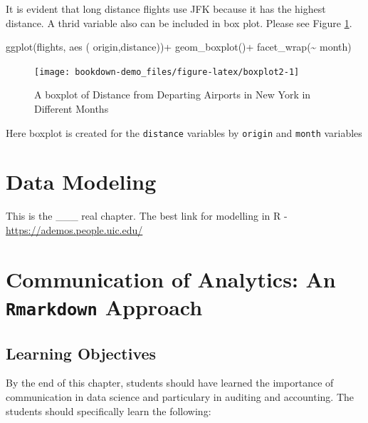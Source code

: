 \documentclass[
]{book}
\newenvironment{Shaded}{\begin{snugshade}}{\end{snugshade}}
\newcommand{\FunctionTok}[1]{\textcolor[rgb]{0.00,0.00,0.00}{#1}}
\newcommand{\NormalTok}[1]{#1}
\newcommand{\SpecialCharTok}[1]{\textcolor[rgb]{0.00,0.00,0.00}{#1}}
\begin{document}
It is evident that long distance flights use JFK because it has the highest distance. A thrid variable also can be included in box plot. Please see Figure \ref{fig:boxplot2}.

\begin{Shaded}
\begin{Highlighting}[]
\FunctionTok{ggplot}\NormalTok{(flights, }\FunctionTok{aes}\NormalTok{ ( origin,distance))}\SpecialCharTok{+}
  \FunctionTok{geom\_boxplot}\NormalTok{()}\SpecialCharTok{+}
  \FunctionTok{facet\_wrap}\NormalTok{(}\SpecialCharTok{\textasciitilde{}}\NormalTok{ month)}
\end{Highlighting}
\end{Shaded}

\begin{figure}

{\centering \texttt{[image: bookdown-demo\_files/figure-latex/boxplot2-1]} 

}

\caption{A boxplot of Distance from Departing Airports in New York in Different Months}\label{fig:boxplot2}
\end{figure}

Here boxplot is created for the \texttt{distance} variables by \texttt{origin} and \texttt{month} variables

\hypertarget{data-modeling}{%
\chapter{Data Modeling}\label{data-modeling}}

This is the \_\_\_ real chapter. The best link for modelling in R - \url{https://ademos.people.uic.edu/}

\hypertarget{communication-of-analytics-an-rmarkdown-approach}{%
\chapter{\texorpdfstring{Communication of Analytics: An \texttt{Rmarkdown} Approach}{Communication of Analytics: An Rmarkdown Approach}}\label{communication-of-analytics-an-rmarkdown-approach}}

\hypertarget{learning-objectives}{%
\section*{Learning Objectives}\label{learning-objectives}}


By the end of this chapter, students should have learned the importance of communication in data science and particulary in auditing and accounting. The students should specifically learn the following:
\end{document}
